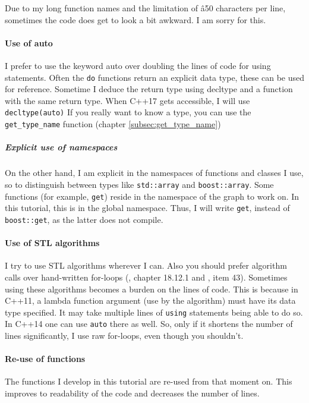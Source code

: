 Due to my long function names and the limitation of â50 characters per line,
sometimes the code does get to look a bit awkward.
I am sorry for this.

\paragraph{Use of auto}

I prefer to use the keyword auto over doubling the lines of code for using
statements.
Often the \verb;do; functions return an explicit data type, these can be used
for reference.
Sometime I deduce the return type using decltype and a function with the
same return type.
When C++17 gets accessible, I will use \verb;decltype(auto);
If you really want to know a type, you can use the \verb;get_type_name; function
(chapter \ref{subsec:get_type_name})

\subparagraph{Explicit use of namespaces}

On the other hand, I am explicit in the namespaces of functions and classes
I use, so to distinguish between types like \verb;std::array; and \verb;boost::array;.
Some functions (for example, \verb;get;) reside 
in the namespace of the graph to work on.
In this tutorial, this is in the global namespace.
Thus, I will write \verb;get;, instead of \verb;boost::get;, 
as the latter does not compile.

\paragraph{Use of STL algorithms}

I try to use STL algorithms wherever I can.
Also you should prefer algorithm calls over hand-written 
for-loops (\cite{stroustrup1997}, chapter 18.12.1 and \cite{meyers2005effective}, item 43).
Sometimes using these algorithms becomes a burden on the lines of code.
This is because in C++11, a lambda function argument (use by the algorithm)
must have its data type specified.
It may take multiple lines of \verb;using; statements being able to do so.
In C++14 one can use \verb;auto; there as well.
So, only if it shortens the number of lines significantly, I use raw for-loops,
even though you shouldn't.

\paragraph{Re-use of functions}

The functions I develop in this tutorial are re-used from that moment on.
This improves to readability of the code and decreases the number of lines.

